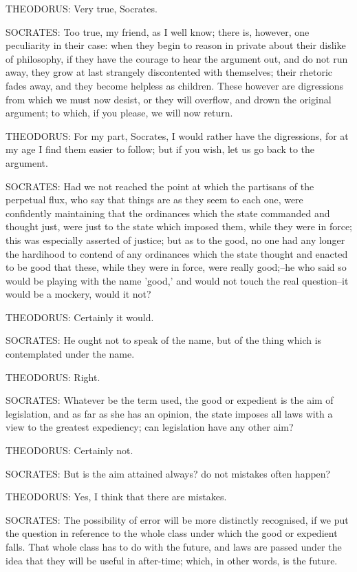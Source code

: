 THEODORUS: Very true, Socrates.

SOCRATES: Too true, my friend, as I well know; there is, however, one
peculiarity in their case: when they begin to reason in private about
their dislike of philosophy, if they have the courage to hear the
argument out, and do not run away, they grow at last strangely
discontented with themselves; their rhetoric fades away, and they become
helpless as children. These however are digressions from which we must
now desist, or they will overflow, and drown the original argument; to
which, if you please, we will now return.

THEODORUS: For my part, Socrates, I would rather have the digressions,
for at my age I find them easier to follow; but if you wish, let us go
back to the argument.

SOCRATES: Had we not reached the point at which the partisans of the
perpetual flux, who say that things are as they seem to each one, were
confidently maintaining that the ordinances which the state commanded
and thought just, were just to the state which imposed them, while they
were in force; this was especially asserted of justice; but as to the
good, no one had any longer the hardihood to contend of any ordinances
which the state thought and enacted to be good that these, while they
were in force, were really good;--he who said so would be playing with
the name 'good,' and would not touch the real question--it would be a
mockery, would it not?

THEODORUS: Certainly it would.

SOCRATES: He ought not to speak of the name, but of the thing which is
contemplated under the name.

THEODORUS: Right.

SOCRATES: Whatever be the term used, the good or expedient is the aim
of legislation, and as far as she has an opinion, the state imposes all
laws with a view to the greatest expediency; can legislation have any
other aim?

THEODORUS: Certainly not.

SOCRATES: But is the aim attained always? do not mistakes often happen?

THEODORUS: Yes, I think that there are mistakes.

SOCRATES: The possibility of error will be more distinctly recognised,
if we put the question in reference to the whole class under which the
good or expedient falls. That whole class has to do with the future, and
laws are passed under the idea that they will be useful in after-time;
which, in other words, is the future.


